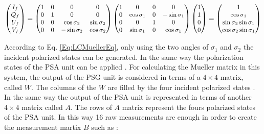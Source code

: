 \documentclass[oneside,a4,12p]{report} %
\begin{document}
	\begin{equation}\label{Eq:LCMuellerEq}
	\small
	\begin{pmatrix} 
	I_{f}\\
	Q_{f}\\
	U_{f}\\	
	V_{f}\\
    \end{pmatrix} = 		
	\begin{pmatrix}
	1 & 0 & 0 & 0 \\
	0 & 1 & 0 & 0 \\
	0 & 0 & \cos \sigma_{2} &  \sin \sigma_{2}\\
	0 & 0 & -\sin \sigma_{2} &  \cos \sigma_{2}\\
	\end{pmatrix}
	\begin{pmatrix}
	1 & 0 & 0 & 0 \\
	0 & \cos \sigma_{1} & 0 & -\sin \sigma_{1} \\
	0 & 0 & 1 & 0 \\
	0 & \sin \sigma_{1} & 0 & \cos \sigma_{1} \\
	\end{pmatrix} 
	\begin{pmatrix}
	1\\
	1\\
	0\\
	0\\
	\end{pmatrix} = 
	\begin{pmatrix}
	1 \\
	\cos\sigma_{1}\\	
	\sin \sigma_{2} \sin \sigma_{1}\\
	\cos \sigma_{2} \sin \sigma_{1}\\
	\end{pmatrix}	
	\end{equation} 

According to Eq. \ref{Eq:LCMuellerEq}, only using the two angles of $\sigma_{1}$ and $\sigma_{2}$ the incident polarized states can be generated. In the same way the polarization states of the PSA unit can be applied \cite{de2004general}. For calculating the Mueller matrix in this system, the output of the PSG unit is considered in terms of a $4\times4$ matrix, called $W$. The columns of the $W$ are filled by the four incident polarized states . In the same way the output of the PSA unit is represented in terms of another $4\times4$ matrix called $A$. The rows of $A$ matrix represent the fours polarized states of the PSA unit. In this way 16 raw measurements are enough in order to create the measurement martix $B$ such as : 
\end{document}
